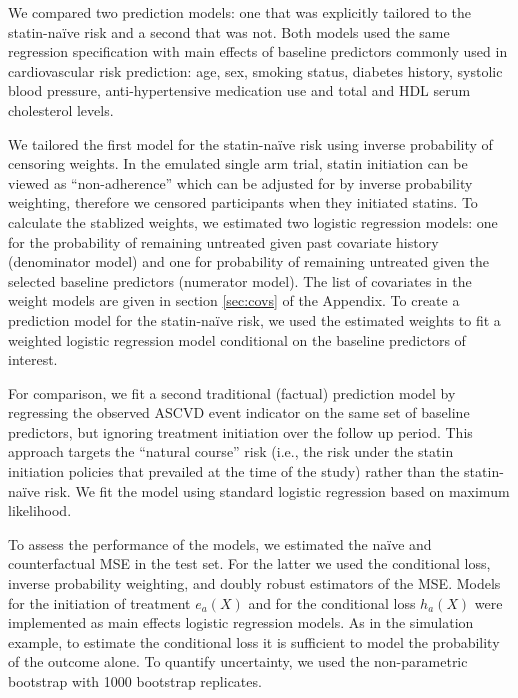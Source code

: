 We compared two prediction models: one that was explicitly tailored to the statin-na\"{i}ve risk and a second that was not. Both models used the same regression specification with main effects of baseline predictors commonly used in cardiovascular risk prediction: age, sex, smoking status, diabetes history, systolic blood pressure, anti-hypertensive medication use and total and HDL serum cholesterol levels.

We tailored the first model for the statin-na\"{i}ve risk using inverse probability of censoring weights. In the emulated single arm trial, statin initiation can be viewed as ``non-adherence'' which can be adjusted for by inverse probability weighting, therefore we censored participants when they initiated statins. To calculate the stablized weights, we estimated two logistic regression models: one for the probability of remaining untreated given past covariate history (denominator model) and one for probability of remaining untreated given the selected baseline predictors (numerator model). The list of covariates in the weight models are given in section \ref{sec:covs} of the Appendix. To create a prediction model for the statin-na\"{i}ve risk, we used the estimated weights to fit a weighted logistic regression model conditional on the baseline predictors of interest. 

For comparison, we fit a second traditional (factual) prediction model by regressing the observed ASCVD event indicator on the same set of baseline predictors, but ignoring treatment initiation over the follow up period. This approach targets the ``natural course'' risk (i.e., the risk under the statin initiation policies that prevailed at the time of the study) rather than the statin-na\"{i}ve risk. We fit the model using standard logistic regression based on maximum likelihood.

To assess the performance of the models, we estimated the na\"{i}ve and counterfactual MSE in the test set. For the latter we used the conditional loss, inverse probability weighting, and doubly robust estimators of the MSE. Models for the initiation of treatment $e_a(X)$ and for the conditional loss $h_a(X)$ were implemented as main effects logistic regression models. As in the simulation example, to estimate the conditional loss it is sufficient to model the probability of the outcome alone. To quantify uncertainty, we used the non-parametric bootstrap with 1000 bootstrap replicates.


